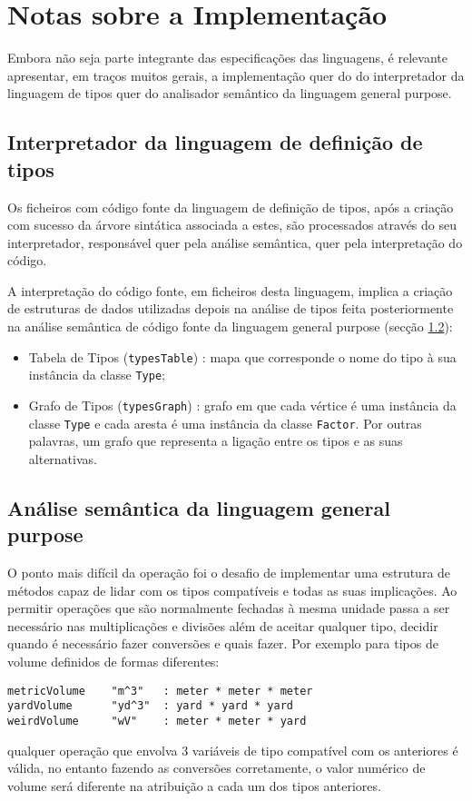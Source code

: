 \documentclass{report}
\begin{document}
\chapter{Notas sobre a Implementação}
\label{chap.implementacao}
Embora não seja parte integrante das especificações das linguagens, é relevante apresentar, em traços muitos gerais, a implementação quer do do interpretador da linguagem de tipos quer do analisador semântico da linguagem general purpose.

\section{Interpretador da linguagem de definição de tipos}
\label{chap.implementacao.types}
Os ficheiros com código fonte da linguagem de definição de tipos, após a criação com sucesso da árvore sintática associada a estes, são processados através do seu interpretador, responsável quer pela análise semântica, quer pela interpretação do código. 

A interpretação do código fonte, em ficheiros desta linguagem, implica a criação de estruturas de dados utilizadas depois na análise de tipos feita posteriormente na análise semântica de código fonte da linguagem general purpose (secção \ref{chap.implementacao.potatoes}):
\begin{itemize}
    \item Tabela de Tipos (\texttt{typesTable}) : mapa que corresponde o nome do tipo à sua instância da classe \texttt{Type};
    \item Grafo de Tipos (\texttt{typesGraph}) : grafo em que cada vértice é uma instância da classe \texttt{Type} e cada aresta é uma instância da classe \texttt{Factor}. Por outras palavras, um grafo que representa a ligação entre os tipos e as suas alternativas.
\end{itemize}

\section{Análise semântica da linguagem general purpose}
\label{chap.implementacao.potatoes}
O ponto mais difícil da operação foi o desafio de implementar uma estrutura de métodos capaz de lidar com os tipos compatíveis e todas as suas implicações.
Ao permitir operações que são normalmente fechadas à mesma unidade passa a ser necessário nas multiplicações e divisões além de aceitar qualquer tipo, decidir quando é necessário fazer conversões e quais fazer. Por exemplo para tipos de volume definidos de formas diferentes:
\begin{lstlisting}
metricVolume    "m^3"   : meter * meter * meter
yardVolume      "yd^3"  : yard * yard * yard
weirdVolume     "wV"    : meter * meter * yard
\end{lstlisting}
qualquer operação que envolva 3 variáveis de tipo compatível com os anteriores é válida, no entanto fazendo as conversões corretamente, o valor numérico de volume será diferente na atribuição a cada um dos tipos anteriores.
\end{document}
